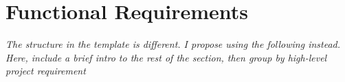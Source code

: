 \section{Functional Requirements}

\textit{The structure in the template is different. I propose using the following instead.} \\
\textit{Here, include a brief intro to the rest of the section, then group by high-level project requirement} \\










